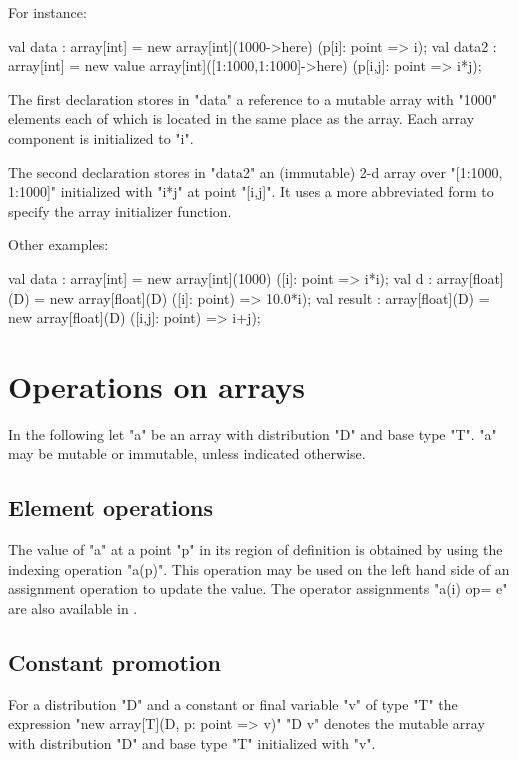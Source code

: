 For instance:
\begin{xten}
val data : array[int]
    = new array[int](1000->here)
        (p[i]: point => i);
val data2 : array[int]
    = new value array[int]([1:1000,1:1000]->here)
        (p[i,j]: point => i*j);
\end{xten}

{}\noindent 
The first declaration stores in \xcd"data" a reference to a mutable
array with \xcd"1000" elements each of which is located in the
same place as the array. Each array component is initialized to \xcd"i".

The second declaration stores in \xcd"data2" an (immutable)
2-d array over \xcd"[1:1000, 1:1000]" initialized with \xcd"i*j"
at point \xcd"[i,j]". It uses a more abbreviated form to specify 
the array initializer function.

Other examples:
\begin{xten}
val data : array[int]
    = new array[int](1000)
        ([i]: point => i*i);
val d : array[float](D)
   = new array[float](D) ([i]: point) => 10.0*i);
val result : array[float](D)
   = new array[float](D) ([i,j]: point) => i+j);
\end{xten}

\section{Operations on arrays}
In the following let \xcd"a" be an array with distribution \xcd"D" and
base type \xcd"T". \xcd"a" may be mutable or immutable, unless
indicated otherwise.

\subsection{Element operations}
The value of \xcd"a" at a point \xcd"p" in its region of definition is
obtained by using the indexing operation \xcd"a(p)". This operation
may be used on the left hand side of an assignment operation to update
the value. The operator assignments \xcd"a(i) op= e" are also available
in \Xten{}.

\subsection{Constant promotion}\label{ConstantArray}

For a distribution \xcd"D" and a constant or final variable \xcd"v" of
type \xcd"T" the expression \xcd"new array[T](D, p: point => v)"
\xcd"D v" denotes the mutable array with
distribution \xcd"D" and base type \xcd"T" initialized with \xcd"v".

